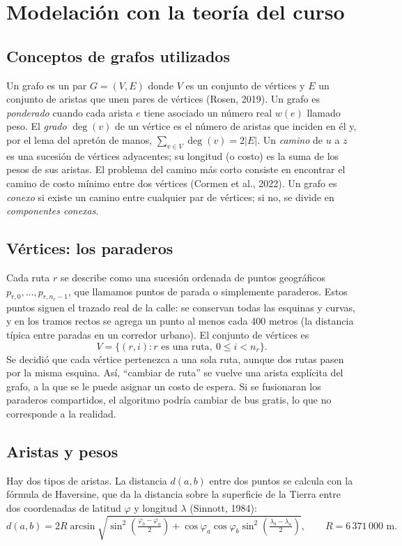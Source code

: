 \documentclass[12pt,letterpaper]{article}
\begin{document}
\section{Modelación con la teoría del curso}

\subsection{Conceptos de grafos utilizados}
Un grafo es un par $G=(V,E)$ donde $V$ es un conjunto de vértices y $E$ un conjunto de aristas que unen pares de vértices (Rosen, 2019). Un grafo es \textit{ponderado} cuando cada arista $e$ tiene asociado un número real $w(e)$ llamado peso. El \textit{grado} $\deg(v)$ de un vértice es el número de aristas que inciden en él y, por el lema del apretón de manos, $\sum_{v\in V}\deg(v)=2|E|$. Un \textit{camino} de $u$ a $z$ es una sucesión de vértices adyacentes; su longitud (o costo) es la suma de los pesos de sus aristas. El problema del camino más corto consiste en encontrar el camino de costo mínimo entre dos vértices (Cormen et al., 2022). Un grafo es \textit{conexo} si existe un camino entre cualquier par de vértices; si no, se divide en \textit{componentes conexas}.

\subsection{Vértices: los paraderos}
Cada ruta $r$ se describe como una sucesión ordenada de puntos geográficos $p_{r,0},\dots,p_{r,n_r-1}$, que llamamos puntos de parada o simplemente paraderos. Estos puntos siguen el trazado real de la calle: se conservan todas las esquinas y curvas, y en los tramos rectos se agrega un punto al menos cada 400 metros (la distancia típica entre paradas en un corredor urbano). El conjunto de vértices es
\[
V=\{(r,i) : r \text{ es una ruta},\ 0\le i<n_r\}.
\]
Se decidió que cada vértice pertenezca a una sola ruta, aunque dos rutas pasen por la misma esquina. Así, ``cambiar de ruta'' se vuelve una arista explícita del grafo, a la que se le puede asignar un costo de espera. Si se fusionaran los paraderos compartidos, el algoritmo podría cambiar de bus gratis, lo que no corresponde a la realidad.

\subsection{Aristas y pesos}
Hay dos tipos de aristas. La distancia $d(a,b)$ entre dos puntos se calcula con la fórmula de Haversine, que da la distancia sobre la superficie de la Tierra entre dos coordenadas de latitud $\varphi$ y longitud $\lambda$ (Sinnott, 1984):
\[
d(a,b)=2R\arcsin\sqrt{\sin^2\!\left(\tfrac{\varphi_b-\varphi_a}{2}\right)+\cos\varphi_a\cos\varphi_b\sin^2\!\left(\tfrac{\lambda_b-\lambda_a}{2}\right)},\qquad R=6\,371\,000\text{ m}.
\]
\end{document}
